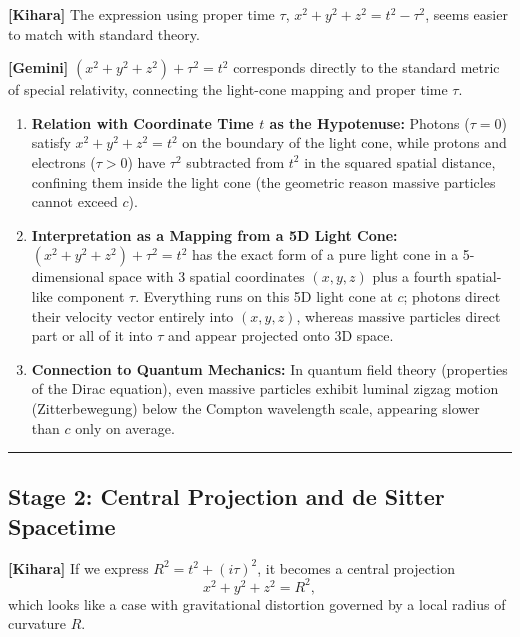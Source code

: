 \documentclass[
  a4paper,
]{article}
\providecommand{\tightlist}{%
  \setlength{\itemsep}{0pt}\setlength{\parskip}{0pt}}
\begin{document}
\textbf{{[}Kihara{]}} The expression using proper time \(\tau\),
\(x^2 + y^2 + z^2 = t^2 - \tau^2\), seems easier to match with standard
theory.

\textbf{{[}Gemini{]}} \((x^2 + y^2 + z^2) + \tau^2 = t^2\) corresponds
directly to the standard metric of special relativity, connecting the
light-cone mapping and proper time \(\tau\).

\begin{enumerate}
\def\labelenumi{\arabic{enumi}.}
\tightlist
\item
  \textbf{Relation with Coordinate Time \(t\) as the Hypotenuse:}
  Photons (\(\tau = 0\)) satisfy \(x^2 + y^2 + z^2 = t^2\) on the
  boundary of the light cone, while protons and electrons (\(\tau > 0\))
  have \(\tau^2\) subtracted from \(t^2\) in the squared spatial
  distance, confining them inside the light cone (the geometric reason
  massive particles cannot exceed \(c\)).
\item
  \textbf{Interpretation as a Mapping from a 5D Light Cone:}
  \((x^2 + y^2 + z^2) + \tau^2 = t^2\) has the exact form of a pure
  light cone in a 5-dimensional space with 3 spatial coordinates
  \((x, y, z)\) plus a fourth spatial-like component \(\tau\).
  Everything runs on this 5D light cone at \(c\); photons direct their
  velocity vector entirely into \((x, y, z)\), whereas massive particles
  direct part or all of it into \(\tau\) and appear projected onto 3D
  space.
\item
  \textbf{Connection to Quantum Mechanics:} In quantum field theory
  (properties of the Dirac equation), even massive particles exhibit
  luminal zigzag motion (Zitterbewegung) below the Compton wavelength
  scale, appearing slower than \(c\) only on average.
\end{enumerate}

\begin{center}\rule{0.5\linewidth}{0.5pt}\end{center}

\subsection{Stage 2: Central Projection and de Sitter
Spacetime}\label{stage-2-central-projection-and-de-sitter-spacetime}

\textbf{{[}Kihara{]}} If we express \(R^2 = t^2 + (i\tau)^2\), it
becomes a central projection \[x^2 + y^2 + z^2 = R^2,\] which looks like
a case with gravitational distortion governed by a local radius of
curvature \(R\).
\end{document}
